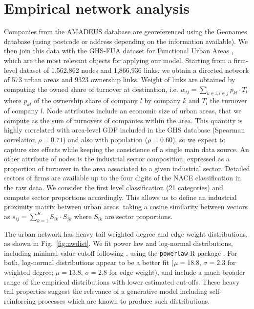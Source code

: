 \documentclass[11pt]{article}
\begin{document}
\section{Empirical network analysis}


Companies from the AMADEUS database are georeferenced using the Geonames database (using postcode or address depending on the information available). We then join this data with the GHS-FUA dataset for Functional Urban Areas \cite{Florczyk2019ghs}, which are the most relevant objects for applying our model. Starting from a firm-level dataset of 1,562,862 nodes and  1,866,936 links, we obtain a directed network of 573 urban areas and 9323 ownership links. Weight of links are obtained by computing the owned share of turnover at destination, i.e. $w_{ij} = \sum_{k \in i,l \in j} p_{kl} \cdot T_l$ where $p_{kl}$ of the ownership share of company $l$ by company $k$ and $T_l$ the turnover of company $l$. Node attributes include an economic size of urban areas, that we compute as the sum of turnovers of companies within the area. This quantity is highly correlated with area-level GDP included in the GHS database (Spearman correlation $\rho = 0.71$) and also with population ($\rho = 0.60$), so we expect to capture size effects while keeping the consistence of a single main data source. An other attribute of nodes is the industrial sector composition, expressed as a proportion of turnover in the area associated to a given industrial sector. Detailed sectors of firms are available up to the four digits of the NACE classification in the raw data. We consider the first level classification (21 categories) and compute sector proportions accordingly. This allows us to define an industrial proximity matrix between urban areas, taking a cosine similarity between vectors as $s_{ij} = \sum_{k=1}^{K} S_{ik}\cdot S_{jk}$ where $S_{ik}$ are sector proportions.


The urban network has heavy tail weighted degree and edge weight distributions, as shown in Fig.~\ref{fig:nwdist}. We fit power law and log-normal distributions, including minimal value cutoff following \cite{clauset2009power}, using the \texttt{powerlaw} R package \cite{powerlawpackage}. For both, log-normal distributions appear to be a better fit ($\mu=18.8$, $\sigma=2.3$ for weighted degree; $\mu=13.8$, $\sigma=2.8$ for edge weight), and include a much broader range of the empirical distributions with lower estimated cut-offs. These heavy tail properties suggest the relevance of a generative model including self-reinforcing processes which are known to produce such distributions.
\end{document}
